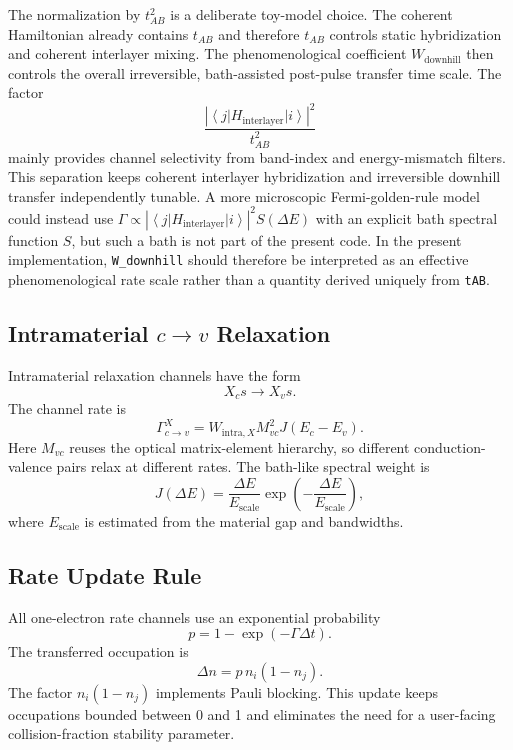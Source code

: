 \documentclass[11pt,a4paper]{article}
\newcommand{\ket}[1]{\left|#1\right\rangle}
\newcommand{\bra}[1]{\left\langle #1\right|}
\begin{document}
The normalization by $t_{AB}^2$ is a deliberate toy-model choice.  The coherent Hamiltonian already contains $t_{AB}$ and therefore $t_{AB}$ controls static hybridization and coherent interlayer mixing.  The phenomenological coefficient $W_{\mathrm{downhill}}$ then controls the overall irreversible, bath-assisted post-pulse transfer time scale.  The factor
\begin{equation}
\frac{|\bra{j}H_{\mathrm{interlayer}}\ket{i}|^2}{t_{AB}^2}
\end{equation}
mainly provides channel selectivity from band-index and energy-mismatch filters.  This separation keeps coherent interlayer hybridization and irreversible downhill transfer independently tunable.  A more microscopic Fermi-golden-rule model could instead use $\Gamma\propto |\bra{j}H_{\mathrm{interlayer}}\ket{i}|^2S(\Delta E)$ with an explicit bath spectral function $S$, but such a bath is not part of the present code.  In the present implementation, \texttt{W\_downhill} should therefore be interpreted as an effective phenomenological rate scale rather than a quantity derived uniquely from \texttt{tAB}.

\subsection{Intramaterial $c\rightarrow v$ Relaxation}

Intramaterial relaxation channels have the form
\begin{equation}
X_c s \rightarrow X_v s.
\end{equation}
The channel rate is
\begin{equation}
\Gamma_{c\rightarrow v}^{X}
=
W_{\mathrm{intra},X}
M_{vc}^2
J(E_c-E_v).
\end{equation}
Here $M_{vc}$ reuses the optical matrix-element hierarchy, so different conduction-valence pairs relax at different rates.  The bath-like spectral weight is
\begin{equation}
J(\Delta E)=\frac{\Delta E}{E_{\mathrm{scale}}}\exp\left(-\frac{\Delta E}{E_{\mathrm{scale}}}\right),
\end{equation}
where $E_{\mathrm{scale}}$ is estimated from the material gap and bandwidths.

\subsection{Rate Update Rule}

All one-electron rate channels use an exponential probability
\begin{equation}
p=1-\exp(-\Gamma\Delta t).
\end{equation}
The transferred occupation is
\begin{equation}
\Delta n = p\,n_i(1-n_j).
\end{equation}
The factor $n_i(1-n_j)$ implements Pauli blocking.  This update keeps occupations bounded between 0 and 1 and eliminates the need for a user-facing collision-fraction stability parameter.
\end{document}
